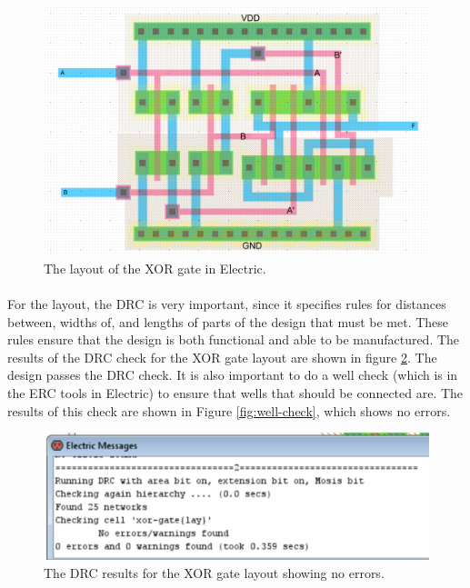 \documentclass{article}
\begin{document}
  \begin{figure}[H]
    \centering
    \includegraphics[width=\linewidth, frame]{screenshots/layout.png}
    \caption{The layout of the XOR gate in Electric.}
    \label{fig:layout}
  \end{figure}

  \paragraph{}
  For the layout, the DRC is very important, since it specifies rules for distances between, widths of, and lengths of parts of the design that must be met. These rules ensure that the design is both functional and able to be manufactured. The results of the DRC check for the XOR gate layout are shown in figure \ref{fig:lay-drc}. The design passes the DRC check. It is also important to do a well check (which is in the ERC tools in Electric) to ensure that wells that should be connected are. The results of this check are shown in Figure \ref{fig:well-check}, which shows no errors.


  \begin{figure}[H]
    \centering
    \includegraphics[width=0.7\linewidth, frame]{screenshots/layout-drc.png}
    \caption{The DRC results for the XOR gate layout showing no errors.}
    \label{fig:lay-drc}
  \end{figure}
\end{document}
